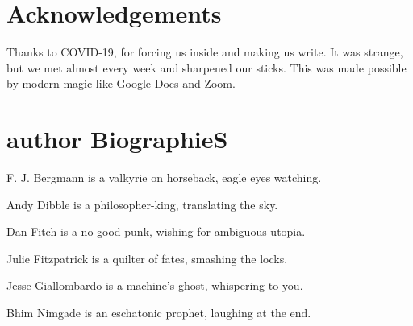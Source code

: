 \chapter*{\variexfont{}Acknowledgements}

\begin{flushleft}
Thanks to COVID-19, for forcing us inside and making us write.
It was strange, but we met almost every week and sharpened our sticks.
This was made possible by modern magic like Google Docs
and Zoom.


\chapter*{\variexfont{}author BiographieS}

F. J. Bergmann is a valkyrie on horseback, eagle eyes watching.

\vspace{2em}
Andy Dibble is a philosopher-king, translating the sky.

\vspace{2em}
Dan Fitch is a no-good punk, wishing for ambiguous utopia.

\vspace{2em}
Julie Fitzpatrick is a quilter of fates, smashing the locks.

\vspace{2em}
Jesse Giallombardo is a machine's ghost, whispering to you.

\vspace{2em}
Bhim Nimgade is an eschatonic prophet, laughing at the end.

\end{flushleft}




